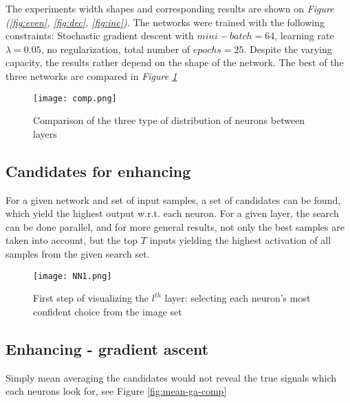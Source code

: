 The experiments width shapes and corresponding results are shown on \emph{Figure (\ref{fig:even}, \ref{fig:dec}, \ref{fig:inc})}.
The networks were trained with the following constraints: Stochastic gradient descent with $mini-batch=64$, learning rate $\lambda = 0.05$, no regularization, total number of $epochs=25$.
Despite the varying capacity, the results rather depend on the shape of the network. The best of the three networks are compared in \emph{Figure \ref{fig:comp}} 

\begin{figure}
    \centering
    \texttt{[image: comp.png]}
    \caption{Comparison of the three type of distribution of neurons between layers}
    \label{fig:comp}
\end{figure}


\subsection{Candidates for enhancing}
\label{method}
For a given network and set of input samples, a set of candidates can be found, which yield the highest output w.r.t. each neuron. 
For a given layer, the search can be done parallel, and for more general results, not only the best samples are taken into account, but the top $T$ inputs yielding the highest activation of all samples from the given search set.
\begin{figure}
    \centering
    \texttt{[image: NN1.png]}
    \caption{First step of visualizing the $l^{th}$ layer: selecting each neuron's most confident choice from the image set}
    \label{fig:n1}
\end{figure}

\subsection{Enhancing - gradient ascent}

Simply mean averaging the candidates would not reveal the true signals which each neurons look for, see Figure \ref{fig:mean-ga-comp}

